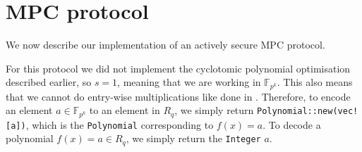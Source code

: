 \documentclass[../main.tex]{subfiles}
\begin{document}
\section{MPC protocol}
We now describe our implementation of an actively secure MPC protocol.

For this protocol we did not implement the cyclotomic polynomial optimisation described earlier, so $s = 1$, meaning that we are working in $\mathbb{F}_{p^k}$.
This also means that we cannot do entry-wise multiplications like done in \cite{damgaard2012multiparty}.
Therefore, to encode an element $a \in \mathbb{F}_{p^k}$ to an element in $R_q$, we simply return \lstinline{Polynomial::new(vec![a])}, which is the \lstinline{Polynomial} corresponding to $f(x) = a$. To decode a polynomial $f(x) = a \in R_q$, we simply return the \lstinline{Integer} $a$.
\end{document}
